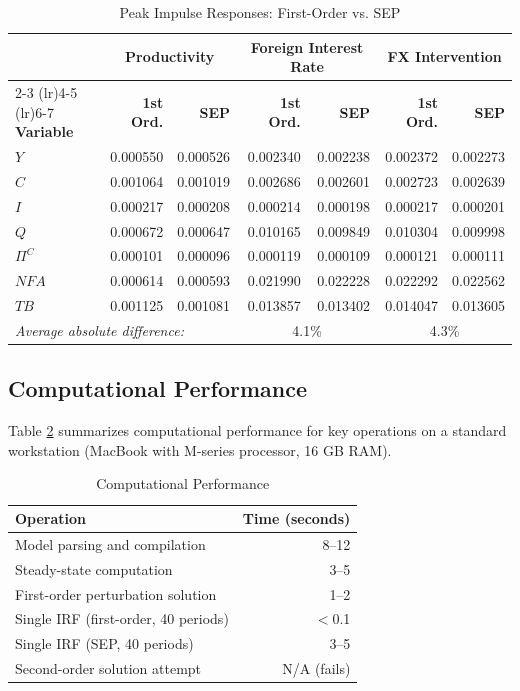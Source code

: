 \documentclass[12pt]{article}
\begin{document}
\begin{table}[H]
\centering
\caption{Peak Impulse Responses: First-Order vs. SEP}\label{tab:irf_comparison}
\small
\begin{tabular}{lrrrrrr}
\toprule
& \multicolumn{2}{c}{\textbf{Productivity}} & \multicolumn{2}{c}{\textbf{Foreign Interest Rate}} & \multicolumn{2}{c}{\textbf{FX Intervention}} \\
\cmidrule(lr){2-3} \cmidrule(lr){4-5} \cmidrule(lr){6-7}
\textbf{Variable} & \textbf{1st Ord.} & \textbf{SEP} & \textbf{1st Ord.} & \textbf{SEP} & \textbf{1st Ord.} & \textbf{SEP} \\
\midrule
$Y$ & 0.000550 & 0.000526 & 0.002340 & 0.002238 & 0.002372 & 0.002273 \\
$C$ & 0.001064 & 0.001019 & 0.002686 & 0.002601 & 0.002723 & 0.002639 \\
$I$ & 0.000217 & 0.000208 & 0.000214 & 0.000198 & 0.000217 & 0.000201 \\
$Q$ & 0.000672 & 0.000647 & 0.010165 & 0.009849 & 0.010304 & 0.009998 \\
$\Pi^C$ & 0.000101 & 0.000096 & 0.000119 & 0.000109 & 0.000121 & 0.000111 \\
$NFA$ & 0.000614 & 0.000593 & 0.021990 & 0.022228 & 0.022292 & 0.022562 \\
$TB$ & 0.001125 & 0.001081 & 0.013857 & 0.013402 & 0.014047 & 0.013605 \\
\midrule
\multicolumn{3}{l}{\textit{Average absolute difference:}} & \multicolumn{2}{c}{4.1\%} & \multicolumn{2}{c}{4.3\%} \\
\bottomrule
\end{tabular}
\end{table}

\subsection{Computational Performance}

Table \ref{tab:performance} summarizes computational performance for key operations on a standard workstation (MacBook with M-series processor, 16 GB RAM).

\begin{table}[H]
\centering
\caption{Computational Performance}\label{tab:performance}
\begin{tabular}{lr}
\toprule
\textbf{Operation} & \textbf{Time (seconds)} \\
\midrule
Model parsing and compilation & 8--12 \\
Steady-state computation & 3--5 \\
First-order perturbation solution & 1--2 \\
Single IRF (first-order, 40 periods) & $<$0.1 \\
Single IRF (SEP, 40 periods) & 3--5 \\
Second-order solution attempt & N/A (fails) \\
\bottomrule
\end{tabular}
\end{table}
\end{document}
